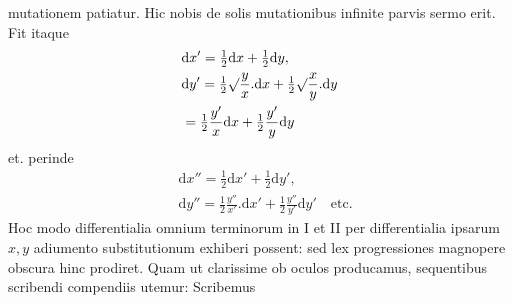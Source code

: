 mutationem patiatur. Hic nobis de solis mutationibus infinite parvis sermo erit.
Fit itaque
\[
\begin{aligned}&\mathrm{d}x'=\tfrac12\mathrm{d}x+\tfrac12\mathrm{d}y,\\&
\mathrm{d}y'=\tfrac12\surd\frac{y}{x}. \mathrm{d}x
+\tfrac12\surd\frac{x}{y}. \mathrm{d}y\\&=\tfrac12\frac{y'}{x}\mathrm{d}x+\tfrac12\frac{y'}{y}\mathrm{d}y\end{aligned}
\]
et. perinde
\[
\begin{aligned}&\mathrm{d}x''=\tfrac12\mathrm{d}x'+\tfrac12\mathrm{d}y',\\&
\mathrm{d}y''=\tfrac12\frac{y''}{x'}. \mathrm{d}x'
+\tfrac12\frac{y''}{y'}\mathrm{d}y'\quad\text{etc.}\end{aligned}
\]
Hoc modo differentialia omnium terminorum in I et II per differentialia ipsarum
$x,y$ adiumento substitutionum exhiberi possent: sed lex progressiones magnopere
obscura hinc prodiret. Quam ut clarissime ob oculos producamus, sequentibus
scribendi compendiis utemur: Scribemus
